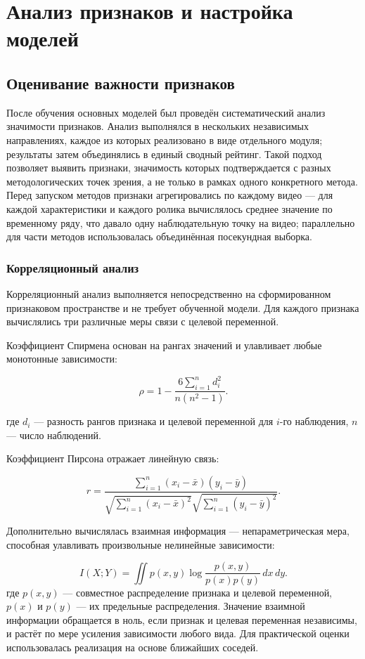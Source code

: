 \documentclass[times]{itmo-student-thesis}
\begin{document}
\section{Анализ признаков и настройка моделей}

\subsection{Оценивание важности признаков}

После обучения основных моделей был проведён систематический анализ значимости признаков. Анализ выполнялся в нескольких независимых направлениях, каждое из которых реализовано в виде отдельного модуля; результаты затем объединялись в единый сводный рейтинг. Такой подход позволяет выявить признаки, значимость которых подтверждается с разных методологических точек зрения, а не только в рамках одного конкретного метода. Перед запуском методов признаки агрегировались по каждому видео — для каждой характеристики и каждого ролика вычислялось среднее значение по временному ряду, что давало одну наблюдательную точку на видео; параллельно для части методов использовалась объединённая посекундная выборка.

\subsubsection{Корреляционный анализ}

Корреляционный анализ выполняется непосредственно на сформированном признаковом пространстве и не требует обученной модели. Для каждого признака вычислялись три различные меры связи с целевой переменной.

Коэффициент Спирмена основан на рангах значений  и улавливает любые монотонные зависимости:

\[
\rho=1-\frac{6\sum_{i=1}^{n}d_i^2}{n(n^2-1)}.
\]

где $d_i$ — разность рангов признака и целевой переменной для $i$-го наблюдения, $n$ — число наблюдений.

Коэффициент Пирсона отражает линейную связь:

\[
r=\frac{\sum_{i=1}^{n}(x_i-\bar{x})(y_i-\bar{y})}{\sqrt{\sum_{i=1}^{n}(x_i-\bar{x})^2}\sqrt{\sum_{i=1}^{n}(y_i-\bar{y})^2}}.
\]

Дополнительно вычислялась взаимная информация — непараметрическая мера, способная улавливать произвольные нелинейные зависимости:

\[
I(X;Y)=\iint p(x,y)\log\frac{p(x,y)}{p(x)p(y)}\,dx\,dy.
\]
где $p(x,y)$ — совместное распределение признака и целевой переменной, $p(x)$ и $p(y)$ — их предельные распределения. Значение взаимной информации обращается в ноль, если признак и целевая переменная независимы, и растёт по мере усиления зависимости любого вида. Для практической оценки использовалась реализация на основе ближайших соседей.
\end{document}
